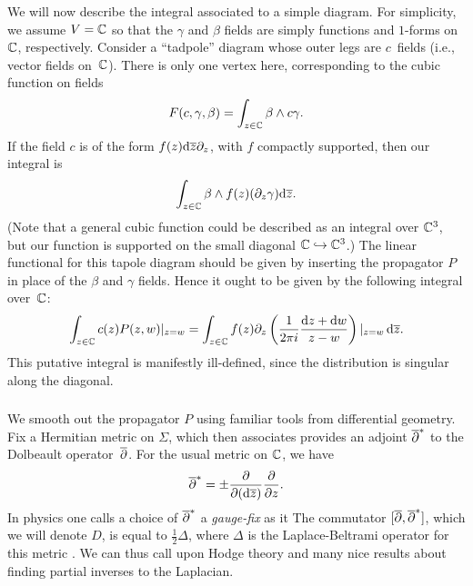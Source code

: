 \subsubsection{}

We will now describe the integral associated to a simple diagram.
For simplicity, we assume $V = \mathbb C$ so that the $\gamma$ and $\beta$ fields are simply functions and $1$-forms on $\mathbb C$, respectively.
Consider a ``tadpole'' diagram whose outer legs are $c$~fields 
(i.e., vector fields on~$\mathbb C$).
There is only one vertex here, corresponding to the cubic function on fields
\[
F(c,\gamma,\beta) = \int_{z \in \mathbb C} \beta \wedge c\gamma.
\]
If the field $c$ is of the form $f(z) {\rm d} \overline{z} \partial_z$,
with $f$ compactly supported, 
then our integral is
\[
\int_{z \in \mathbb C} \beta \wedge f(z)(\partial_z\gamma) {\rm d} \overline{z}.
\]
(Note that a general cubic function could be described as an integral over $\mathbb C^3$,
but our function is supported on the small diagonal $\mathbb C \hookrightarrow \mathbb C^3$.)
The linear functional for this tapole diagram should be given by inserting the propagator $P$ in place of the $\beta$ and $\gamma$ fields. 
Hence it ought to be given by the following integral over~$\mathbb C$:
\[
\int_{z \in \mathbb C} c(z)P(z,w)|_{z = w}  
= \int_{z \in \mathbb C} f(z) \partial_z \left(  \frac{1}{2 \pi i} \frac{{\rm d} z + {\rm d} w}{z-w}\right)|_{z = w}\, {\rm d} \overline{z}.
\]
This putative integral is manifestly ill-defined,
since the distribution is singular along the diagonal.

\subsubsection{}

We smooth out the propagator $P$ using familiar tools from differential geometry.
Fix a Hermitian metric on $\Sigma$, 
which then associates provides an adjoint $\overline{\partial}^*$ to the Dolbeault operator~$\overline{\partial}$.
For the usual metric on $\mathbb C$, we have
\[
\overline{\partial}^* = \pm \frac{\partial}{\partial ({\rm d} \overline{z})} \frac{\partial}{\partial z}.
\]
In physics one calls a choice of $\overline{\partial}^*$ a {\em gauge-fix} as it 
The commutator $[\overline{\partial},\overline{\partial}^*]$, which we will denote $D$, 
is equal to $\tfrac{1}{2} \Delta$, where $\Delta$ is the Laplace-Beltrami operator for this metric .
We can thus call upon Hodge theory and many nice results about finding partial inverses to the Laplacian.

